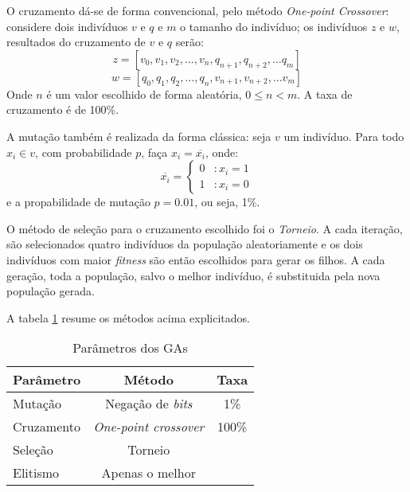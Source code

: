 \documentclass[12pt]{article}
\begin{document}
O cruzamento dá-se de forma convencional, pelo método \emph{One-point Crossover}: considere dois indivíduos $v$ e $q$ e $m$ o tamanho do indivíduo; os indivíduos $z$ e $w$, resultados do cruzamento de $v$ e $q$ serão:
\[
  z = [v_0, v_1, v_2, \dots, v_n, q_{n+1}, q_{n+2}, \dots q_m]
\]
\[
   w = [q_0, q_1, q_2, \dots, q_n, v_{n+1}, v_{n+2}, \dots v_m]
\]
Onde $n$ é um valor escolhido de forma aleatória, $ 0 \le n < m$.
A taxa de cruzamento é de 100\%.

A mutação também é realizada da forma clássica: seja $v$ um indivíduo. Para todo $x_i \in v$, com probabilidade $p$, faça $x_i = \overline{x_i}$, onde:
 \begin{displaymath}
   \overline{x_i} = \left\{
     \begin{array}{lr}
       0 & : x_i = 1 \\
       1 & : x_i = 0
     \end{array}
   \right.
\end{displaymath} 
e a propabilidade de mutação $p = 0.01$, ou seja, 1\%. 

O método de seleção para o cruzamento escolhido foi o \emph{Torneio}. A cada iteração, são selecionados quatro indivíduos da população aleatoriamente e os dois indivíduos com maior \emph{fitness} são então escolhidos para gerar os filhos. A cada geração, toda a população, salvo o melhor indivíduo, é substituida pela nova população gerada.

A tabela \ref{tab:param} resume os métodos acima explicitados.

\begin{table} 
\centering
\begin{tabular}{|l|c|c|}
\hline 
\textbf{Parâmetro} & \textbf{Método} & \textbf{Taxa}\\ \hline
Mutação & Negação de \emph{bits} & 1\% \\ \hline
Cruzamento & \emph{One-point crossover} & 100\%  \\ \hline
Seleção & Torneio  \\ \cline{0-1}
Elitismo & Apenas o melhor \\ \cline{0-1}
\end{tabular}
\caption{Parâmetros dos GAs}
\label{tab:param}
\end{table}








\end{document}
